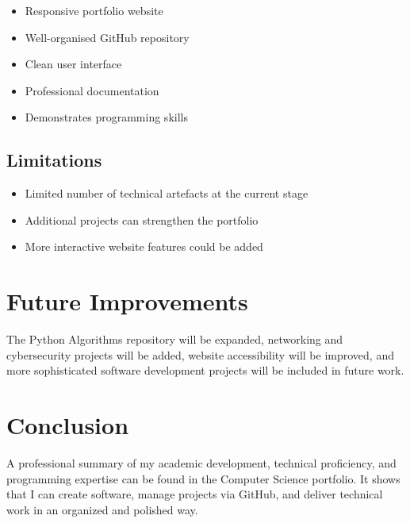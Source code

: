 \documentclass[12pt,a4paper]{article}
\begin{document}
\begin{itemize}
\item Responsive portfolio website
\item Well-organised GitHub repository
\item Clean user interface
\item Professional documentation
\item Demonstrates programming skills
\end{itemize}

\subsection{Limitations}

\begin{itemize}
\item Limited number of technical artefacts at the current stage
\item Additional projects can strengthen the portfolio
\item More interactive website features could be added
\end{itemize}

\section{Future Improvements}

The Python Algorithms repository will be expanded, networking and cybersecurity projects will be added, website accessibility will be improved, and more sophisticated software development projects will be included in future work.

\section{Conclusion}

A professional summary of my academic development, technical proficiency, and programming expertise can be found in the Computer Science portfolio. It shows that I can create software, manage projects via GitHub, and deliver technical work in an organized and polished way.
\end{document}
